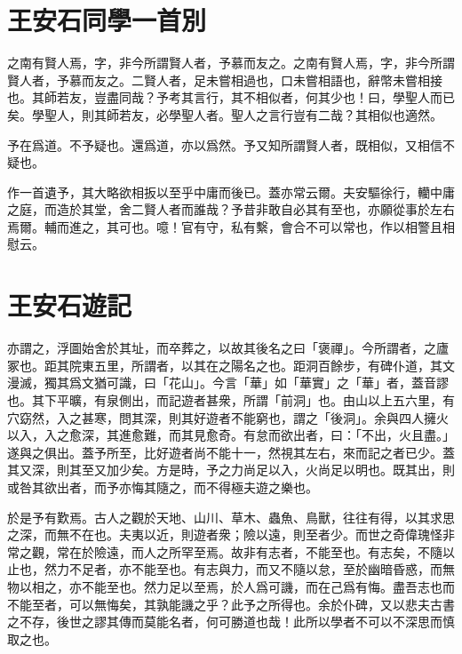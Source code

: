 \theendnotes

\section[同學一首別子固\quad{\small 王安石}]{{\normalsize 王安石}\quad 同學一首別}
之南有賢人焉，字，非今所謂賢人者，予慕而友之。之南有賢人焉，字，非今所謂賢人者，予慕而友之。二賢人者，足未嘗相過也，口未嘗相語也，辭幣未嘗相接也。其師若友，豈盡同哉？予考其言行，其不相似者，何其少也！曰，學聖人而已矣。學聖人，則其師若友，必學聖人者。聖人之言行豈有二哉？其相似也適然。

予在爲道。不予疑也。還爲道，亦以爲然。予又知所謂賢人者，既相似，又相信不疑也。

作一首遺予，其大略欲相扳以至乎中庸而後已。蓋亦常云爾。夫安驅徐行，轥中庸之庭，而造於其{堂}，舍二賢人者而誰哉？予昔非敢自必其有至也，亦願從事於左右焉爾。輔而進之，其可也。噫！官有守，私有繫，會合不可以常也，作以相警且相慰云。%
\theendnotes

\section[遊褒禪山記\quad{\small 王安石}]{{\normalsize 王安石}\quad 遊記}
亦謂之，浮圖始舍於其址，而卒葬之，以故其後名之曰「褒禪」。今所謂者，之廬冢也。距其院東五里，所謂者，以其在之陽名之也。距洞百餘步，有碑仆道，其文漫滅，獨其爲文猶可識，曰「花山」。今言「華」如「華實」之「華」者，蓋音謬也。其下平曠，有泉側出，而記遊者甚衆，所謂「前洞」也。由山以上五六里，有穴窈然，入之甚寒，問其深，則其好遊者不能窮也，謂之「後洞」。余與四人擁火以入，入之愈深，其進愈難，而其見愈奇。有怠而欲出者，曰：「不出，火且盡。」遂與之俱出。蓋予所至，比好遊者尚不能十一，然視其左右，來而記之者已少。蓋其又深，則其至又加少矣。方是時，予之力尚足以入，火尚足以明也。既其出，則或咎其欲出者，而予亦悔其隨之，而不得極夫遊之樂也。

於是予有歎焉。古人之觀於天地、山川、草木、蟲魚、鳥獸，往往有得，以其求思之深，而無不在也。夫夷以近，則遊者衆；險以遠，則至者少。而世之奇偉瑰怪非常之觀，常在於險遠，而人之所罕至焉。故非有志者，不能至也。有志矣，不隨以止也，然力不足者，亦不能至也。有志與力，而又不隨以怠，至於幽暗昏惑，而無物以相之，亦不能至也。然力足以至焉，於人爲可譏，而在己爲有悔。盡吾志也而不能至者，可以無悔矣，其孰能譏之乎？此予之所得也。余於仆碑，又以悲夫古書之不存，後世之謬其傳而莫能名者，何可勝道也哉！此所以學者不可以不深思而慎取之也。


